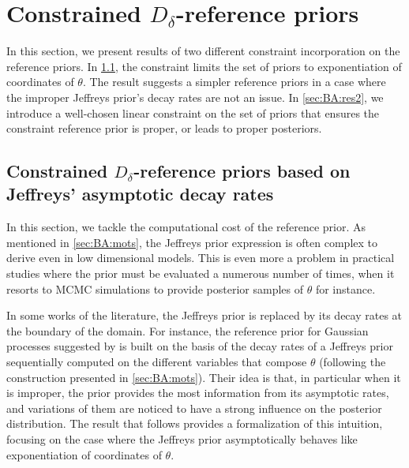 \section{Constrained $D_\delta$-reference priors}\label{sec:BA:ress}


In this section, we present results of two different constraint incorporation on the reference priors.
In \cref{sec:BA:res1}, the constraint limits the set of priors to exponentiation of coordinates of $\theta$. The result suggests a simpler reference priors in a case where the improper Jeffreys prior's decay rates are not an issue.
In \cref{sec:BA:res2}, we introduce a well-chosen linear constraint on the set of priors that ensures the constraint reference prior is proper, or leads to proper posteriors.



\subsection{Constrained $D_\delta$-reference priors based on Jeffreys' asymptotic decay rates}\label{sec:BA:res1}




    


    In this section, we tackle the computational cost of the reference prior. As mentioned in \cref{sec:BA:mots}, the Jeffreys prior expression is often complex to derive even in low dimensional models. This is even more a problem in practical studies where the prior must be evaluated a numerous number of times, when it resorts to MCMC simulations to provide posterior samples of $\theta$ for instance.

    In some works of the literature, the Jeffreys prior is replaced by its decay rates at the boundary of the domain. For instance, the reference prior for Gaussian processes suggested by \citet{gu_jointly_2019} is built on the basis of the decay rates of a Jeffreys prior sequentially computed on the different variables that compose $\theta$ (following the construction presented in \cref{sec:BA:mots}).
    Their idea is that, in particular when it is improper, the prior provides the most information from its asymptotic rates, and variations of them are noticed to have a strong influence on the posterior distribution.
    The result that follows provides a formalization of this intuition, focusing on the case where the Jeffreys prior asymptotically behaves like exponentiation of coordinates of $\theta$.
    
